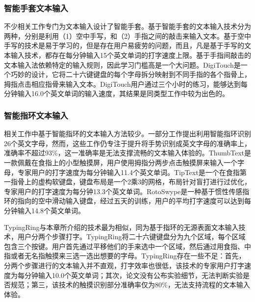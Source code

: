 \subsubsection{智能手套文本输入}

不少相关工作专门为文本输入设计了智能手套。基于智能手套的文本输入技术分为两种，分别是利用（1）空中手写，和（2）手指之间的敲击来输入文本。基于空中手写的技术是易于学习的\cite{amma2012airwriting, zhou2008hand}，但是存在用户易疲劳的问题，而且，凡是基于手写的文本输入技术，都存在每分钟输入15个英文单词的打字速度上限\cite{devoe1967alternatives}。基于手指间敲击的文本输入法依赖特定的输入规则\cite{bajer2012huffman, goldstein1999finger, peshock2014argot, rosenberg1999chording, seibel1962performance, whitmire2017digitouch}，因此学习门槛高是一个大问题。DigiTouch\cite{whitmire2017digitouch}是一个巧妙的设计，它将二十六键键盘的每个字母拆分映射到不同手指的各个指骨上，拇指点击相应指骨来输入文本。DigiTouch用户通过三个小时的练习，能够达到每分钟输入16.0个英文单词的输入速度，其结果是同类型工作中较为出色的。

\subsubsection{智能指环文本输入}

相关工作中基于智能指环的文本输入方法较少。一部分工作提出利用智能指环识别26个英文字母\cite{gummeson2014energy, zhang2017fingersound, zhang2018fingerping}，然而，这些工作仍专注于提升将手势识别成英文字母的准确率上，准确率不超过93\%，这一准确率是无法支撑流畅的文本输入体验的。ThumbText是一款佩戴在食指上的小型触摸屏\cite{kim2018thumbtext}，用户使用拇指分两步点击触摸屏来输入一个字母，专家用户的打字速度为每分钟输入11.4个英文单词。TipText是一个在食指第一指骨上的虚构软键盘\cite{xu2019tiptext}，键盘布局是一个2乘3的网格，布局针对盲打进行过优化，专家用户的打字速度为每分钟13.3个英文单词。RotoSwype是一种基于惯性传感指环的指向的空中滑动输入键盘\cite{gupta2019rotoswype}，经过五天的训练，用户的平均打字速度可以达到每分钟输入14.8个英文单词。

TypingRing\cite{nirjon2015MobiSys}与本章所介绍的技术最为相似，同为基于指环的无源表面文本输入技术，用户分两个步骤打字。TypingRing将二十六键键盘分为九个区域，每个区域包含三个按键。用户首先通过平移他们的手来选中一个区域，然后通过用食指、中指或者无名指触摸来三选一选出想要的字母。TypingRing存在一些不足：首先，分两个步骤进行的文本输入并不直观，打字效率也很低，该技术的专家用户打字速度为每分钟输入10.0个英文单词；其次，论文没有公布实验细节，无法判断实验是否规范；第三，该技术的触摸识别部分准确率仅为80\%，无法支持流程的文本输入体验。

